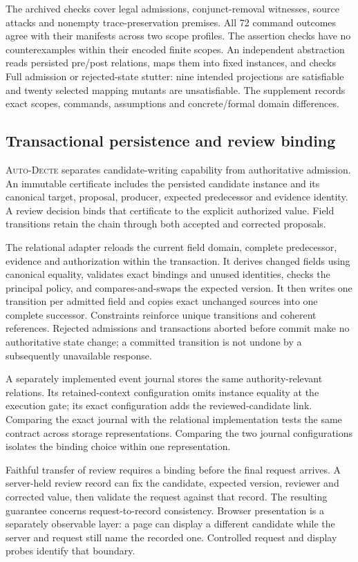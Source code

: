\documentclass[10pt,a4paper,twocolumn]{article}
\newcommand{\system}{\textsc{Auto-Decte}}
\begin{document}
The archived checks cover legal admissions, conjunct-removal witnesses, source attacks and nonempty trace-preservation premises. All 72 command outcomes agree with their manifests across two scope profiles. The assertion checks have no counterexamples within their encoded finite scopes. An independent abstraction reads persisted pre/post relations, maps them into fixed instances, and checks Full admission or rejected-state stutter: nine intended projections are satisfiable and twenty selected mapping mutants are unsatisfiable. The supplement records exact scopes, commands, assumptions and concrete/formal domain differences.

\subsection{Transactional persistence and review binding}
\system{} separates candidate-writing capability from authoritative admission. An immutable certificate includes the persisted candidate instance and its canonical target, proposal, producer, expected predecessor and evidence identity. A review decision binds that certificate to the explicit authorized value. Field transitions retain the chain through both accepted and corrected proposals.

The relational adapter reloads the current field domain, complete predecessor, evidence and authorization within the transaction. It derives changed fields using canonical equality, validates exact bindings and unused identities, checks the principal policy, and compares-and-swaps the expected version. It then writes one transition per admitted field and copies exact unchanged sources into one complete successor. Constraints reinforce unique transitions and coherent references. Rejected admissions and transactions aborted before commit make no authoritative state change; a committed transition is not undone by a subsequently unavailable response.

A separately implemented event journal stores the same authority-relevant relations. Its retained-context configuration omits instance equality at the execution gate; its exact configuration adds the reviewed-candidate link. Comparing the exact journal with the relational implementation tests the same contract across storage representations. Comparing the two journal configurations isolates the binding choice within one representation.

Faithful transfer of review requires a binding before the final request arrives. A server-held review record can fix the candidate, expected version, reviewer and corrected value, then validate the request against that record. The resulting guarantee concerns request-to-record consistency. Browser presentation is a separately observable layer: a page can display a different candidate while the server and request still name the recorded one. Controlled request and display probes identify that boundary.
\end{document}
